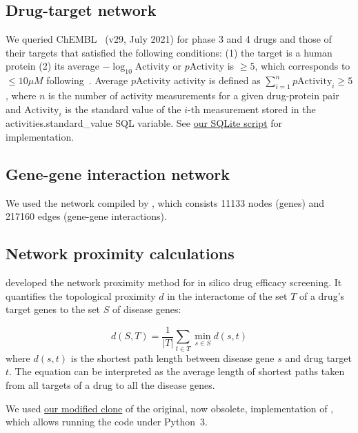 \documentclass[letterpaper]{article}
\begin{document}
\subsection{Drug-target network}

We queried ChEMBL~\citep{Gaulton2017} (v29, July 2021) for phase 3 and 4 drugs
and those of their targets that satisfied the following conditions: (1) the
target is a human protein (2) its average $-\log_{10}\mathrm{Activity}$ or
$p\mathrm{Activity}$ is $\ge 5$, which corresponds to $\le 10 \mu M$
following~\cite{Cheng2018}.  Average $p\mathrm{Activity}$ activity is defined
as $\sum_{i=1}^n p\mathrm{Activity}_i \ge 5$, where $n$ is the number of
activity measurements for a given drug-protein pair and $\mathrm{Activity}_i$
is the standard value of the $i$-th measurement stored in the
activities.standard\_value SQL variable.  See
\href{https://github.com/attilagk/CTNS-notebook/blob/main/2021-10-24-chembl-query/drug_target_avg_activity.sql}{our SQLite script} for implementation.

\subsection{Gene-gene interaction network}

We used the network compiled by \cite{Cheng2019}, which consists 11133 nodes
(genes) and 217160 edges (gene-gene interactions).

\subsection{Network proximity calculations}

\cite{Guney2016} developed the network proximity method for in silico drug efficacy screening.  It
quantifies the topological proximity $d$ in the interactome of the set $T$ of a drug's target genes
to the set $S$ of disease genes: 

\begin{equation}
  d(S, T) = \frac{1}{|T|}\sum_{t \in T} \min_{s \in S} d(s, t)
\end{equation}
where $d(s,t)$ is the shortest path length between disease gene $s$ and drug
target $t$.  The equation can be interpreted as the average length of shortest
paths taken from all targets of a drug to all the disease genes.

We used \href{https://github.com/attilagk/guney_code}{our modified clone} of
the original, now obsolete, implementation of \cite{Guney2016}, which allows
running the code under Python~3.
\end{document}
